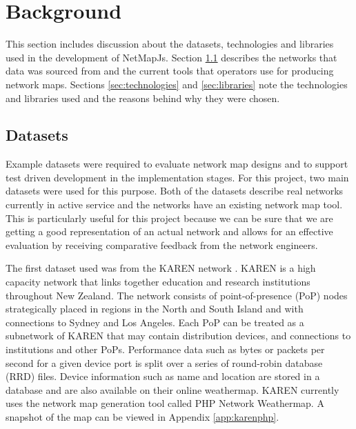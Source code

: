\documentclass[11pt, a4paper]{report}
\begin{document}
\chapter{Background}
\label{sec:background}

This section includes discussion about the datasets, technologies and libraries
used in the development of NetMapJs. Section \ref{sec:datasets} describes the
networks that data was sourced from and the current tools that operators use for
producing network maps. Sections \ref{sec:technologies} and \ref{sec:libraries}
note the technologies and libraries used and the reasons behind why they were
chosen.

\section{Datasets}
\label{sec:datasets}

Example datasets were required to evaluate network map designs and to support
test driven development in the implementation stages. For this project, two main
datasets were used for this purpose. Both of the datasets describe real networks
currently in active service and the networks have an existing network map tool.
This is particularly useful for this project because we can be sure that we are
getting a good representation of an actual network and allows for an effective
evaluation by receiving comparative feedback from the network engineers. 

The first dataset used was from the KAREN network \cite{KAREN_website}. KAREN is
a high capacity network that links together education and research institutions
throughout New Zealand. The network consists of point-of-presence (PoP) nodes
strategically placed in regions in the North and South Island and with
connections to Sydney and Los Angeles. Each PoP can be treated as a subnetwork
of KAREN that may contain distribution devices, and connections to institutions
and other PoPs.  Performance data such as bytes or packets per second for a
given device port is split over a series of round-robin database (RRD) files.
Device information such as name and location are stored in a database and are
also available on their online weathermap. KAREN currently uses the network map
generation tool called PHP Network Weathermap. A snapshot of the map can be
viewed in Appendix \ref{app:karenphp}.
\end{document}
